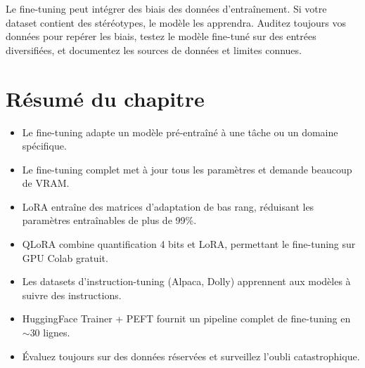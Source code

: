 \begin{ethicsbox}
Le fine-tuning peut int\'egrer des biais des donn\'ees d'entra\^inement. Si votre dataset contient des st\'er\'eotypes, le mod\`ele les apprendra. Auditez toujours vos donn\'ees pour rep\'erer les biais, testez le mod\`ele fine-tun\'e sur des entr\'ees diversifi\'ees, et documentez les sources de donn\'ees et limites connues.
\end{ethicsbox}

\section{R\'esum\'e du chapitre}

\begin{itemize}
  \item Le fine-tuning adapte un mod\`ele pr\'e-entra\^in\'e \`a une t\^ache ou un domaine sp\'ecifique.
  \item Le fine-tuning complet met \`a jour tous les param\`etres et demande beaucoup de VRAM.
  \item LoRA entra\^ine des matrices d'adaptation de bas rang, r\'eduisant les param\`etres entra\^inables de plus de 99\%.
  \item QLoRA combine quantification 4 bits et LoRA, permettant le fine-tuning sur GPU Colab gratuit.
  \item Les datasets d'instruction-tuning (Alpaca, Dolly) apprennent aux mod\`eles \`a suivre des instructions.
  \item HuggingFace Trainer + PEFT fournit un pipeline complet de fine-tuning en $\sim$30 lignes.
  \item \'Evaluez toujours sur des donn\'ees r\'eserv\'ees et surveillez l'oubli catastrophique.
\end{itemize}
